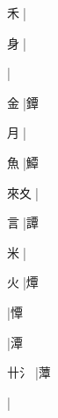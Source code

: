 \begin{multicols}{2}
{{\cjk{}{\cnsym{}　}禾{\cnxJzr{}}}\mktsJzrVerticalBar{}{\cjk{}{\cnsym{}　}{\cnsym{}　}{\cnsym{}　}}|{}\par
{\cjk{}{\cnsym{}　}身{\cnxJzr{}}}\mktsJzrVerticalBar{}{\cjk{}{\cnsym{}　}{\cnsym{}　}{\cnsym{}　}}|{}\par
{}\mktsJzrVerticalBar{}{\cjk{}{\cnsym{}　}{\cnsym{}　}{\cnsym{}　}}|{}\par
{\cjk{}{\cnsym{}　}金{\cnxJzr{}}}\mktsJzrVerticalBar{}{\cjk{}{\cnsym{}　}{\cnsym{}　}{\cnsym{}　}}|{\cjk{}鐔}\par
{\cjk{}{\cnsym{}　}月{\cnxJzr{}}}\mktsJzrVerticalBar{}{\cjk{}{\cnsym{}　}{\cnsym{}　}{\cnsym{}　}}|{}\par
{\cjk{}{\cnsym{}　}魚{\cnxJzr{}}}\mktsJzrVerticalBar{}{\cjk{}{\cnsym{}　}{\cnsym{}　}{\cnsym{}　}}|{\cjk{}鱏}\par
{\cjk{}來夊{\cnxJzr{}}}\mktsJzrVerticalBar{}{\cjk{}{\cnsym{}　}{\cnsym{}　}{\cnsym{}　}}|{}\par
{\cjk{}{\cnsym{}　}言{\cnxJzr{}}}\mktsJzrVerticalBar{}{\cjk{}{\cnsym{}　}{\cnsym{}　}{\cnsym{}　}}|{\cjk{}譚}\par
{\cjk{}{\cnsym{}　}米{\cnxJzr{}}}\mktsJzrVerticalBar{}{\cjk{}{\cnsym{}　}{\cnsym{}　}{\cnsym{}　}}|{}\par
{\cjk{}{\cnsym{}　}火{\cnxJzr{}}}\mktsJzrVerticalBar{}{\cjk{}{\cnsym{}　}{\cnsym{}　}{\cnsym{}　}}|{\cjk{}燂}\par
{}\mktsJzrVerticalBar{}{\cjk{}{\cnsym{}　}{\cnsym{}　}{\cnsym{}　}}|{\cjk{}憛}\par
{}\mktsJzrVerticalBar{}{\cjk{}{\cnsym{}　}{\cnsym{}　}{\cnsym{}　}}|{\cjk{}潭}\par
{\cjk{}卄{\cnxHanaA{}氵}{\cnxJzr{}}}\mktsJzrVerticalBar{}{\cjk{}{\cnsym{}　}{\cnsym{}　}{\cnsym{}　}}|{\cjk{}藫}\par
{}\mktsJzrVerticalBar{}{\cjk{}{\cnsym{}　}{\cnsym{}　}{\cnsym{}　}}|{}\par
}
\end{multicols}
